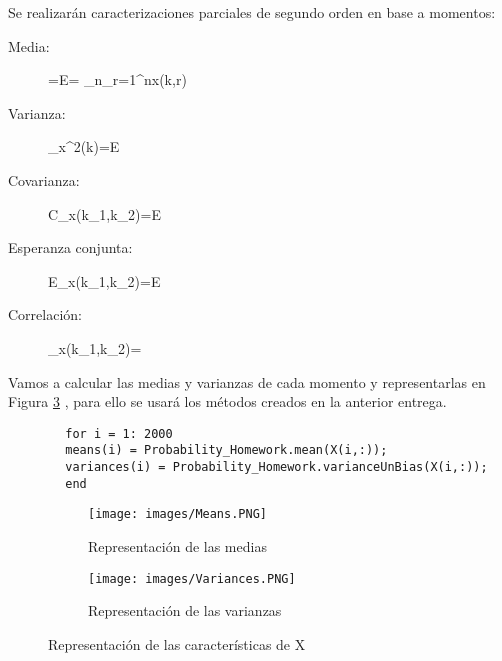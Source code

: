 \documentclass[a4paper, fontsize=11pt]{scrartcl} %
\numberwithin{equation}{section} %
\numberwithin{figure}{section} %
\numberwithin{table}{section} %
\newenvironment{myalign}{\par\nobreak\large\noindent\align}{\endalign} %
\begin{document}
	Se realizarán caracterizaciones parciales de segundo orden en base a momentos:\\
	
	\begin{description}
		\item[Media:] 
		\begin{myalign}
			=E\left[x(k)\right] = \lim\limits_{n\rightarrow \infty}\sum_{r=1}^{n}x(k,r)
		\end{myalign}
		\item[Varianza:]
		\begin{myalign}
			\sigma_x^2(k)=E
		\end{myalign}
		\item[Covarianza:]
		\begin{myalign}
			C_x(k_1,k_2)=E
		\end{myalign}
		\item[Esperanza conjunta:]
		\begin{myalign}
			E_x(k_1,k_2)=E\left[ x(k_1)x(k_2) \right]
		\end{myalign}
		\item[Correlación:]
		\begin{myalign}
			\rho_x(k_1,k_2)=
		\end{myalign}
	\end{description}
	
	Vamos a calcular las medias y varianzas de cada momento y representarlas en Figura \ref{Caracteristicas} , para ello se usará los métodos creados en la anterior entrega.\\
	
	\begin{lstlisting}
		for i = 1: 2000
		means(i) = Probability_Homework.mean(X(i,:));
		variances(i) = Probability_Homework.varianceUnBias(X(i,:));
		end
	\end{lstlisting}
	
	\begin{figure}[h!]
		\centering
		\begin{subfigure}{0.5\textwidth}
			\centering
			\texttt{[image: images/Means.PNG]}
			\caption{Representación de las medias}
			\label{Medias}
		\end{subfigure}%
		\begin{subfigure}{0.5\textwidth}
			\centering
			\texttt{[image: images/Variances.PNG]}
			\caption{Representación de las varianzas}
			\label{Varianzas}
		\end{subfigure}
		\caption{Representación de las características de X}
		\label{Caracteristicas}
	\end{figure}
	\FloatBarrier
	
\end{document}
